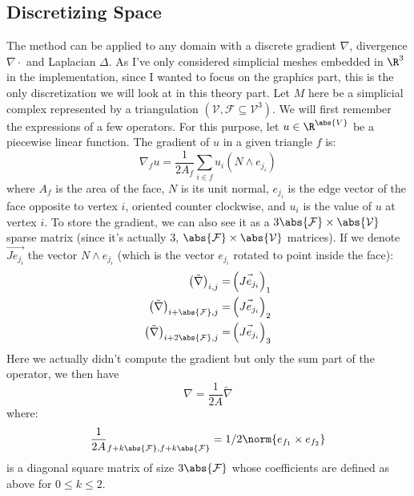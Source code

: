\documentclass[math, info, english]{cours}
\def\mF{\mathcal{F}}
\def\mV{\mathcal{V}}
\begin{document}
\subsection{Discretizing Space}
The method can be applied to any domain with a discrete gradient $\nabla$, divergence $\nabla \cdot$ and Laplacian $\Delta$.
As I've only considered simplicial meshes embedded in $\R^{3}$ in the implementation, since I wanted to focus on the graphics part, this is the only discretization we will look at in this theory part.
Let $M$ here be a simplicial complex represented by a triangulation $\left(\mV, \mF \subseteq \mV^{3}\right)$.
We will first remember the expressions of a few operators.
For this purpose, let $u \in \R^{\abs{V}}$ be a piecewise linear function.
The gradient of $u$ in a given triangle $f$ is:
\begin{equation}
	\nabla_{f} u = \frac{1}{2A_{f}}\sum_{i \in f} u_{i}\left( N \land e_{j_{i}} \right)
\end{equation}
where $A_{f}$ is the area of the face, $N$ is its unit normal, $e_{j_{i}}$ is the edge vector of the face opposite to vertex $i$, oriented counter clockwise, and $u_{i}$ is the value of $u$ at vertex $i$.
To store the gradient, we can also see it as a $3\abs{\mF} \times \abs{\mV}$ sparse matrix (since it's actually $3$, $\abs{\mF}\times \abs{\mV}$ matrices).
If we denote $\vec{Je_{j_{i}}}$ the vector $N \land e_{j_{i}}$ (which is the vector $e_{j_{i}}$ rotated to point inside the face):
\begin{equation}
	\begin{aligned}
		\left(\tilde{\nabla}\right)_{i, j} =& \left( \vec{Je_{j_{i}}} \right)_{1}\\
		\left(\tilde{\nabla}\right)_{i + \abs{\mF}, j} =& \left( \vec{Je_{j_{i}}} \right)_{2}\\
		\left(\tilde{\nabla}\right)_{i + 2\abs{\mF}, j} =& \left( \vec{Je_{j_{i}}} \right)_{3}
	\end{aligned}
\end{equation}
Here we actually didn't compute the gradient but only the sum part of the operator, we then have
\begin{equation}
	\nabla = \frac{1}{2A}\tilde{\nabla}
\end{equation}
where:
\begin{equation}
	\frac{1}{2A}_{f + k\abs{\mF}, f + k\abs{\mF}} = 1 / 2\norm{e_{f_{1}} \times e_{f_{2}}}
\end{equation}
is a diagonal square matrix of size $3\abs{\mF}$ whose coefficients are defined as above for $0 \leq k \leq 2$.
\end{document}
